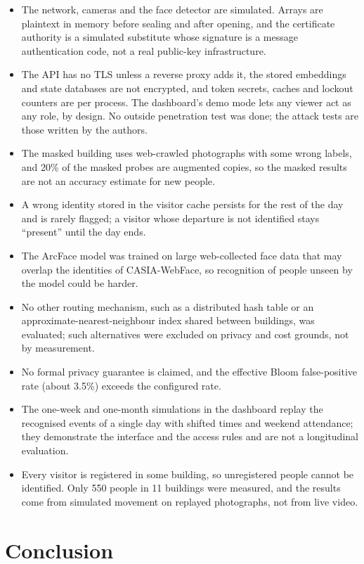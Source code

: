 \documentclass[12pt,a4paper,oneside]{report}
\begin{document}
\begin{itemize}
\item The network, cameras and the face detector are simulated. Arrays are plaintext in memory before sealing and after opening, and the certificate authority is a simulated substitute whose signature is a message authentication code, not a real public-key infrastructure.
\item The API has no TLS unless a reverse proxy adds it, the stored embeddings and state databases are not encrypted, and token secrets, caches and lockout counters are per process. The dashboard's demo mode lets any viewer act as any role, by design. No outside penetration test was done; the attack tests are those written by the authors.
\item The masked building uses web-crawled photographs with some wrong labels, and 20\% of the masked probes are augmented copies, so the masked results are not an accuracy estimate for new people.
\item A wrong identity stored in the visitor cache persists for the rest of the day and is rarely flagged; a visitor whose departure is not identified stays ``present'' until the day ends.
\item The ArcFace model was trained on large web-collected face data that may overlap the identities of CASIA-WebFace, so recognition of people unseen by the model could be harder.
\item No other routing mechanism, such as a distributed hash table or an approximate-nearest-neighbour index shared between buildings, was evaluated; such alternatives were excluded on privacy and cost grounds, not by measurement.
\item No formal privacy guarantee is claimed, and the effective Bloom false-positive rate (about 3.5\%) exceeds the configured rate.
\item The one-week and one-month simulations in the dashboard replay the recognised events of a single day with shifted times and weekend attendance; they demonstrate the interface and the access rules and are not a longitudinal evaluation.
\item Every visitor is registered in some building, so unregistered people cannot be identified. Only 550 people in 11 buildings were measured, and the results come from simulated movement on replayed photographs, not from live video.
\end{itemize}

\clearpage
\chapter{Conclusion}
\end{document}
